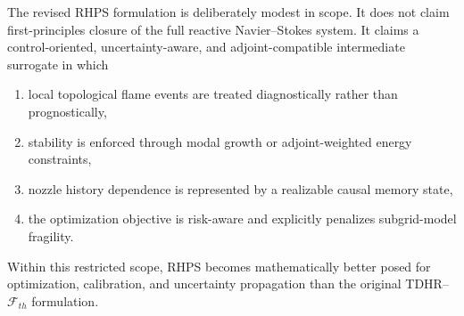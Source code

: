 The revised RHPS formulation is deliberately modest in scope.
It does not claim first-principles closure of the full reactive Navier--Stokes system.
It claims a control-oriented, uncertainty-aware, and adjoint-compatible
intermediate surrogate in which
\begin{enumerate}
\item local topological flame events are treated diagnostically rather than prognostically,
\item stability is enforced through modal growth or adjoint-weighted energy constraints,
\item nozzle history dependence is represented by a realizable causal memory state,
\item the optimization objective is risk-aware and explicitly penalizes subgrid-model fragility.
\end{enumerate}
Within this restricted scope, RHPS becomes mathematically better posed for optimization,
calibration, and uncertainty propagation than the original TDHR--$\mathcal{F}_{th}$ formulation.

